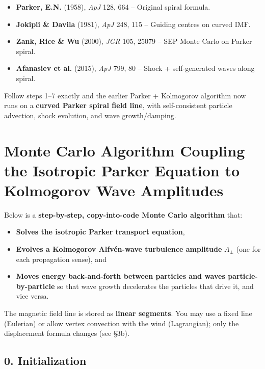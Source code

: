 \begin{itemize}
    \item \textbf{Parker, E.N.} (1958), \textit{ApJ} 128, 664 – Original spiral formula.
    \item \textbf{Jokipii \& Davila} (1981), \textit{ApJ} 248, 115 – Guiding centres on curved IMF.
    \item \textbf{Zank, Rice \& Wu} (2000), \textit{JGR} 105, 25079 – SEP Monte Carlo on Parker spiral.
    \item \textbf{Afanasiev et al.} (2015), \textit{ApJ} 799, 80 – Shock + self-generated waves along spiral.
\end{itemize}

\bigskip

\noindent
Follow steps 1–7 exactly and the earlier Parker + Kolmogorov algorithm now runs on a \textbf{curved Parker spiral field line}, with self-consistent particle advection, shock evolution, and wave growth/damping.


\section*{Monte Carlo Algorithm Coupling the Isotropic Parker Equation to Kolmogorov Wave Amplitudes}

Below is a \textbf{step-by-step, copy-into-code Monte Carlo algorithm} that:

\begin{itemize}
  \item \textbf{Solves the isotropic Parker transport equation},
  \item \textbf{Evolves a Kolmogorov Alfvén-wave turbulence amplitude} $A_\pm$ (one for each propagation sense), and
  \item \textbf{Moves energy back-and-forth between particles and waves particle-by-particle} so that wave growth decelerates the particles that drive it, and vice versa.
\end{itemize}

The magnetic field line is stored as \textbf{linear segments}. You may use a fixed line (Eulerian) or allow vertex convection with the wind (Lagrangian); only the displacement formula changes (see §3b).

\subsection*{0. Initialization}

